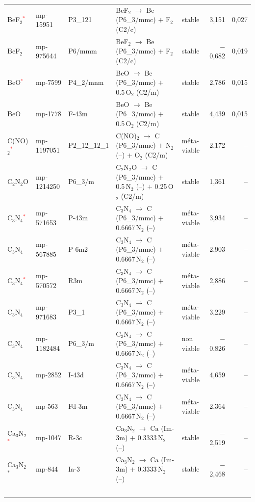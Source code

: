 \begin{longtable}{@{}ll l@{\hspace{4pt}} p{4.6cm} l@{\hspace{4pt}} rr@{}}
BeF$_{2}$\textcolor{red}{$^*$} & mp-15951 & P3\_121 & BeF$_{2}$ $\to$ Be (P6\_3/mmc) $+$ F$_{2}$ (C2/c) & stable & 3{,}151 & 0{,}027 \\
BeF$_{2}$ & mp-975644 & P6/mmm & BeF$_{2}$ $\to$ Be (P6\_3/mmc) $+$ F$_{2}$ (C2/c) & stable & $-$0{,}682 & 0{,}019 \\
BeO\textcolor{red}{$^*$} & mp-7599 & P4\_2/mnm & BeO $\to$ Be (P6\_3/mmc) $+$ 0.5\,O$_{2}$ (C2/m) & stable & 2{,}786 & 0{,}015 \\
BeO & mp-1778 & F-43m & BeO $\to$ Be (P6\_3/mmc) $+$ 0.5\,O$_{2}$ (C2/m) & stable & 4{,}439 & 0{,}015 \\
C(NO)$_{2}$\textcolor{red}{$^*$} & mp-1197051 & P2\_12\_12\_1 & C(NO)$_{2}$ $\to$ C (P6\_3/mmc) $+$ N$_{2}$ (--) $+$ O$_{2}$ (C2/m) & m\'eta-viable & 2{,}172 & -- \\
C$_{2}$N$_{2}$O & mp-1214250 & P6\_3/m & C$_{2}$N$_{2}$O $\to$ C (P6\_3/mmc) $+$ 0.5\,N$_{2}$ (--) $+$ 0.25\,O$_{2}$ (C2/m) & stable & 1{,}361 & -- \\
C$_{3}$N$_{4}$\textcolor{red}{$^*$} & mp-571653 & P-43m & C$_{3}$N$_{4}$ $\to$ C (P6\_3/mmc) $+$ 0.6667\,N$_{2}$ (--) & m\'eta-viable & 3{,}934 & -- \\
C$_{3}$N$_{4}$ & mp-567885 & P-6m2 & C$_{3}$N$_{4}$ $\to$ C (P6\_3/mmc) $+$ 0.6667\,N$_{2}$ (--) & m\'eta-viable & 2{,}903 & -- \\
C$_{3}$N$_{4}$\textcolor{red}{$^*$} & mp-570572 & R3m & C$_{3}$N$_{4}$ $\to$ C (P6\_3/mmc) $+$ 0.6667\,N$_{2}$ (--) & m\'eta-viable & 2{,}886 & -- \\
C$_{3}$N$_{4}$ & mp-971683 & P3\_1 & C$_{3}$N$_{4}$ $\to$ C (P6\_3/mmc) $+$ 0.6667\,N$_{2}$ (--) & m\'eta-viable & 3{,}229 & -- \\
C$_{3}$N$_{4}$ & mp-1182484 & P6\_3/m & C$_{3}$N$_{4}$ $\to$ C (P6\_3/mmc) $+$ 0.6667\,N$_{2}$ (--) & non viable & $-$0{,}826 & -- \\
C$_{3}$N$_{4}$ & mp-2852 & I-43d & C$_{3}$N$_{4}$ $\to$ C (P6\_3/mmc) $+$ 0.6667\,N$_{2}$ (--) & m\'eta-viable & 4{,}659 & -- \\
C$_{3}$N$_{4}$ & mp-563 & Fd-3m & C$_{3}$N$_{4}$ $\to$ C (P6\_3/mmc) $+$ 0.6667\,N$_{2}$ (--) & m\'eta-viable & 2{,}364 & -- \\
Ca$_{3}$N$_{2}$\textcolor{red}{$^*$} & mp-1047 & R-3c & Ca$_{3}$N$_{2}$ $\to$ Ca (Im-3m) $+$ 0.3333\,N$_{2}$ (--) & stable & $-$2{,}519 & -- \\
Ca$_{3}$N$_{2}$$^*$ & mp-844 & Ia-3 & Ca$_{3}$N$_{2}$ $\to$ Ca (Im-3m) $+$ 0.3333\,N$_{2}$ (--) & stable & $-$2{,}468 & -- \\
$$
\end{longtable}
